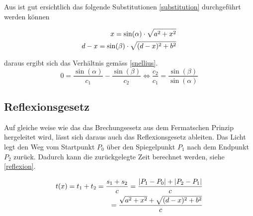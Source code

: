 Aus  ist gut ersichtlich das folgende Substitutionen \ref{substitution} durchgeführt werden können

\begin{align}
	x = \sin(\alpha) \cdot \sqrt{a^2 + x^2} \notag \\
	d-x = \sin(\beta) \cdot \sqrt{(d -x)^2 + b^2} \label{substitution}
\end{align}


daraus ergibt sich das Verhältnis gemäss \eqref{snellius}.
\begin{equation}
	0 = \frac{\sin(\alpha)}{c_1} - \frac{\sin(\beta)}{c_2} \Leftrightarrow\frac{c_2}{c_1} = \frac{\sin(\beta)}{\sin(\alpha)}
	\label{snellius}
\end{equation}




\subsection{Reflexionsgesetz}
\cite{Wikipedia} Auf gleiche weise wie das das Brechungsesetz aus dem Fermatschen Prinzip hergeleitet wird, 
lässt sich daraus auch das Reflexionsgesetz ableiten.
Das Licht legt den Weg vom Startpunkt $P_0$ über den Spiegelpunkt $P_1$ 
nach dem Endpunkt $P_2$ zurück. Dadurch kann die zurückgelegte Zeit berechnet werden, siehe \eqref{reflexion}.



\begin{align}
t(x) = t_1 + t_2 = \frac{s_1 + s_2}{c} = \frac{|P_1 - P_0| + |P_2 - P_1|}{c} \notag \\
= \frac{\sqrt{a^2 + x^2} + \sqrt{(d-x)^2 + b^2}}{c} \label{reflexion}
\end{align}

